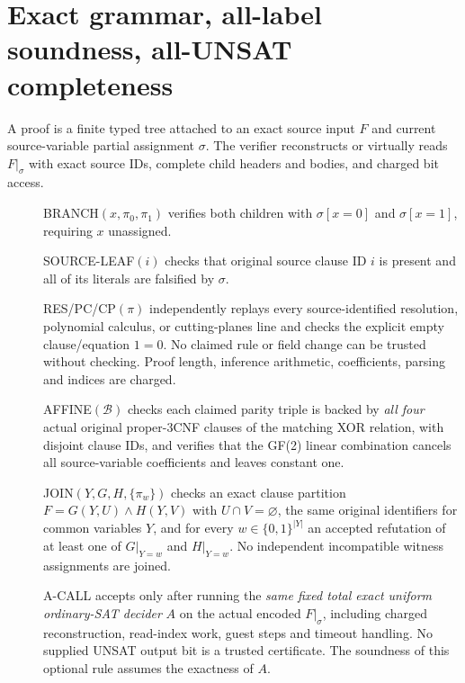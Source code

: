 \documentclass[11pt]{article}
\begin{document}
\section{Exact grammar, all-label soundness, all-UNSAT completeness}
A proof is a finite typed tree attached to an exact source input $F$ and
current source-variable partial assignment $\sigma$. The verifier
reconstructs or virtually reads $F|_\sigma$ with exact source IDs,
complete child headers and bodies, and charged bit access.
\begin{description}
\item[] BRANCH$(x,\pi_0,\pi_1)$ verifies both children with
$\sigma[x=0]$ and $\sigma[x=1]$, requiring $x$ unassigned.
\item[] SOURCE-LEAF$(i)$ checks that original source clause ID $i$
is present and all of its literals are falsified by $\sigma$.
\item[] RES/PC/CP$(\pi)$ independently replays every source-identified
resolution, polynomial calculus, or cutting-planes line and checks
the explicit empty clause/equation $1=0$. No claimed rule or field
change can be trusted without checking. Proof length, inference
arithmetic, coefficients, parsing and indices are charged.
\item[] AFFINE$(\mathcal B)$ checks each claimed parity triple is
backed by \emph{all four} actual original proper-3CNF clauses of
the matching XOR relation, with disjoint clause IDs, and verifies
that the GF(2) linear combination cancels all source-variable
coefficients and leaves constant one.
\item[] JOIN$(Y,G,H,\{\pi_w\})$ checks an exact clause partition
$F=G(Y,U)\wedge H(Y,V)$ with $U\cap V=\varnothing$, the same
original identifiers for common variables $Y$, and for every
$w\in\{0,1\}^{|Y|}$ an accepted refutation of at least one
of $G|_{Y=w}$ and $H|_{Y=w}$. No independent incompatible witness
assignments are joined.
\item[] A-CALL accepts only after running the \emph{same fixed total
exact uniform ordinary-SAT decider} $A$ on the actual encoded
$F|_\sigma$, including charged reconstruction, read-index work,
guest steps and timeout handling. No supplied UNSAT output bit
is a trusted certificate. The soundness of this optional rule
assumes the exactness of $A$.
\end{description}
\end{document}
